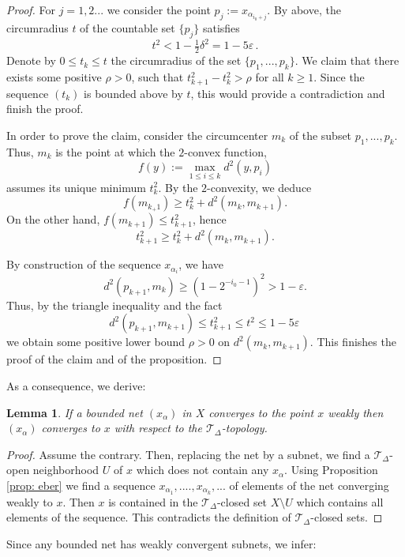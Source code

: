 \documentclass[12pt,leqno]{amsart}
\numberwithin{equation}{section}
\newtheorem{lem}[thm]{Lemma}
\theoremstyle{remark}
\begin{document}
\begin{proof}
For $j=1,2...$ we consider the point $p_j\mathrel{:=} x_{\alpha _{i_0+ j}}$. By above, the circumradius $t$
of the countable set $\{p_j\}$ satisfies 
$$t^2 < 1 -\tfrac 1 2 \delta ^2 = 1-5\varepsilon \,.$$ 
Denote by $0\leq t_k \leq t$ the circumradius of the set $\{p_1,...,p_k\}$.
We claim that there exists some positive $\rho >0$, such that $t^2_{k+1}-t^2_k >\rho$ for all $k\geq 1$. Since the sequence $(t_k)$ is bounded above by $t$, this would provide a contradiction and finish the proof.

In order to prove the claim, consider the circumcenter $m_k$ of the subset $p_1,...,p_k$.
Thus, $m_k$ is the point at which the $2$-convex function, 
$$f(y)\mathrel{:=} \max_{1\leq i \leq k} d^2 (y,p_i)$$ 
assumes its unique minimum $t_k ^2$. By the $2$-convexity, we deduce
$$f(m_{k_+1}) \geq t_k ^2 + d^2 (m_k,m_{k+1}).$$
On the other hand, $f(m_{k+1}) \leq t^2_{k+1}$, hence 
$$t_{k+1} ^2 \geq t_k ^2 + d^2 (m_k,m_{k+1}).$$ 

By construction of the sequence $x_{\alpha_i}$, we have 
$$d^2(p_{k+1}, m_k) \geq (1- 2^{-i_0-1})^2 > 1 -\varepsilon .$$
Thus, by the triangle inequality and the fact 
$$d^2 (p_{k+1} , m_{k+1}) \leq t_{k+1} ^2 \leq t^2 \leq 1-5\varepsilon \,$$
we obtain some positive lower bound $\rho>0$ on $d^2(m_k,m_{k+1})$. 
This finishes the proof of the claim and of the proposition. 
\end{proof}

As a consequence, we derive: 

\begin{lem} \label{lem: h}
If a bounded net $(x_{\alpha})$ in $X$ converges to the point $x$ weakly then $(x_{\alpha})$ converges to $x$ with respect to the $\mathcal T_{\Delta}$-topology.
\end{lem} 

\begin{proof}
Assume the contrary.
Then, replacing the net by a subnet, we find a $\mathcal T_{\Delta}$-open neighborhood $U$ of $x$ which does not contain any $x_{\alpha}$. Using 
Proposition \ref{prop: eber} we find a sequence $x_{\alpha_1},....,x_{\alpha _k},...$ of elements of the net converging weakly to $x$. Then $x$ is contained in the $\mathcal T_{\Delta}$-closed set $X\setminus U$ which contains all elements of the sequence. This contradicts the definition of $\mathcal T_{\Delta}$-closed sets. 	
\end{proof}

Since any bounded net has weakly convergent subnets, we infer:
\end{document}
